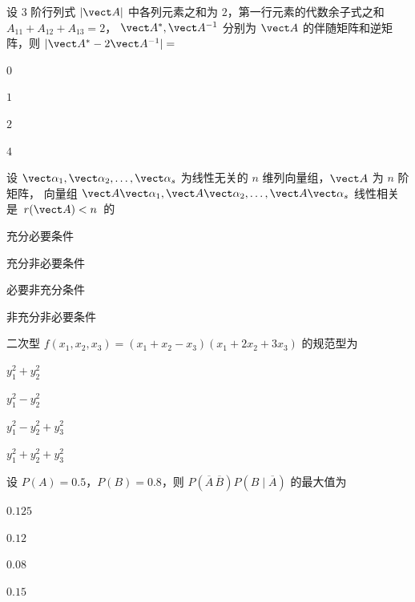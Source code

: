 \begin{question}[index=5]
设 $3$ 阶行列式 $|\vect A|$ 中各列元素之和为 $2$，第一行元素的代数余子式之和 $A_{11}+A_{12}+A_{13}=2$，
$\vect A^*,\vect A^{-1}$ 分别为 $\vect A$ 的伴随矩阵和逆矩阵，则 $|\vect A^*-2\vect A^{-1}|=$
\begin{choices}[columns=4]
\item $0$
\item $1$
\item $2$
\item $4$
\end{choices}
\end{question}
\QuestionBreak

\begin{question}[index=6]
设 $\vect\alpha_1,\vect\alpha_2,\ldots,\vect\alpha_s$ 为线性无关的 $n$ 维列向量组，$\vect A$ 为 $n$ 阶矩阵，
向量组 $\vect A\vect\alpha_1,\vect A\vect\alpha_2,\ldots,\vect A\vect\alpha_s$ \allowbreak\mbox{线性相关是 $r(\vect A)<n$ 的}
\begin{choices}[columns=2]
\item 充分必要条件
\item 充分非必要条件
\item 必要非充分条件
\item 非充分非必要条件
\end{choices}
\end{question}
\QuestionBreak

\begin{question}[index=7]
二次型 $f(x_1,x_2,x_3)=(x_1+x_2-x_3)(x_1+2x_2+3x_3)$ 的规范型为
\begin{choices}[columns=4]
\item $y_1^2+y_2^2$
\item $y_1^2-y_2^2$
\item $y_1^2-y_2^2+y_3^2$
\item $y_1^2+y_2^2+y_3^2$
\end{choices}
\end{question}
\QuestionBreak

\begin{question}[index=8]
设 $P(A)=0.5$，$P(B)=0.8$，则 $P(\overline A\,\overline B)P(B\mid\overline A)$ 的最大值为
\begin{choices}[columns=4]
\item $0.125$
\item $0.12$
\item $0.08$
\item $0.15$
\end{choices}
\end{question}
\QuestionBreak

